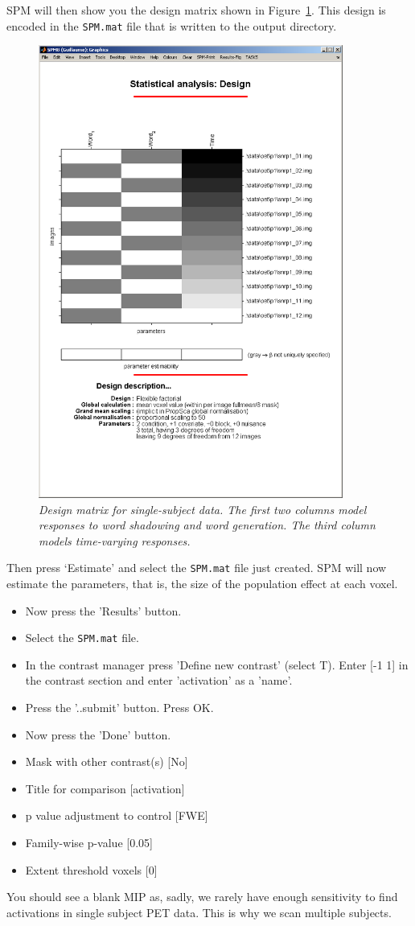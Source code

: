 SPM will then show you the design matrix shown in Figure~\ref{single_design}. This design is encoded in the \texttt{SPM.mat} file that is written to the output directory.
\begin{figure}
\begin{center}
\includegraphics[width=100mm]{pet/single_design}
\caption{\em Design matrix for single-subject data. The first two columns model responses to word shadowing and word generation. The third column models time-varying responses. \label{single_design}}
\end{center}
\end{figure}
Then press `Estimate' and select the \texttt{SPM.mat} file just created. SPM will now estimate the parameters, that is, the size of the population effect at each voxel.
\begin{itemize}
\item{Now press the 'Results' button.}
\item{Select the \texttt{SPM.mat} file.}
\item{In the contrast manager press 'Define new contrast' (select T). Enter [-1 1] in the contrast section and enter 'activation' as a 'name'.}
\item{Press the '..submit' button. Press OK.}
\item{Now press the 'Done' button.}
\item{Mask with other contrast(s) [No]}
\item{Title for comparison [activation]}
\item{p value adjustment to control [FWE]}
\item{Family-wise p-value [0.05]}
\item{Extent threshold {voxels} [0]}
\end{itemize}
You should see a blank MIP as, sadly, we rarely have enough sensitivity to find activations in single subject PET data. This is why we scan multiple subjects.

